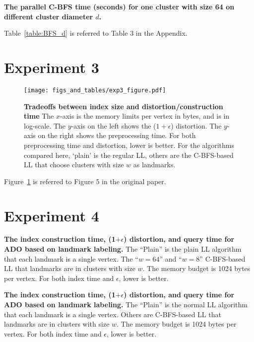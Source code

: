 \documentclass{article}
\begin{document}
\begin{table}[htbp]
  \centering
  \footnotesize
  
  \caption{
    \small\textbf{The parallel C-BFS time (seconds) for one cluster with size 64 on different cluster diameter $d$.} 
    \label{table:BFS_d}
  }
\end{table}
Table~\ref{table:BFS_d} is referred to Table 3 in the Appendix. 

\section{Experiment 3}
\begin{figure}
  \centering
  \texttt{[image: figs\_and\_tables/exp3\_figure.pdf]}    \caption{\small \textbf{Tradeoffs between index size and distortion/construction time}
  The $x$-axis is the memory limits per vertex in bytes, and is in log-scale. The $y$-axis on the left shows the ($1+\epsilon$) distortion.  The $y$-axis on the right shows the preprocessing time. For both preprocessing time and
  distortion, lower is better. For the algorithms compared here, `plain' is the regular LL, others are the C-BFS-based LL that choose clusters with size $w$ as landmarks.
  \label{fig:approx}
  }
\end{figure} 

Figure~\ref{fig:approx} is referred to Figure 5 in the original paper.

\section{Experiment 4}

\begin{table}[htbp]
  \centering
  \footnotesize
  
  \caption{
    \small\textbf{The index construction time, (1$+\epsilon$) distortion, and query time for ADO
    based on landmark labeling.} The ``Plain'' is the plain LL algorithm that each landmark is a single vertex. The ``$w=64$'' and ``$w=8$'' C-BFS-based LL that landmarks are in clusters with size $w$.
    The memory budget is 1024 bytes per vertex. For both index time and $\epsilon$, lower is better. 
    \label{table:ApproxLL}
  }
\end{table}

\begin{table}[htbp]
  \centering
  \small
  
  \caption{
    \small\textbf{The index construction time, (1$+\epsilon$) distortion, and query time for ADO
    based on landmark labeling.} The ``Plain'' is the normal LL algorithm that each landmark is a single vertex. Others are C-BFS-based LL that landmarks are in clusters with size $w$.
    The memory budget is 1024 bytes per vertex. For both index time and $\epsilon$, lower is better. 
    \label{table:ApproxLL_full}
  }
\end{table}
\end{document}
